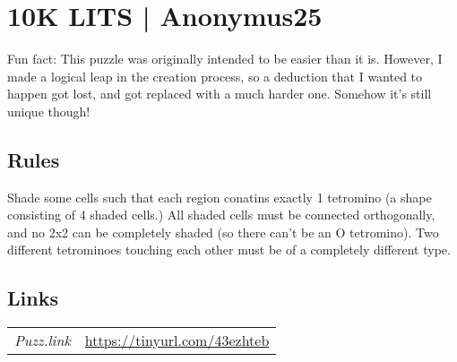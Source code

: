 \section[10K LITS | Anonymus25 {[\emph{LITS}]}]{10K LITS | {\normalfont Anonymus25}}
\label{sec:19-10k-lits-anonymus25}
Fun fact: This puzzle was originally intended to be easier than it is. However, I made a logical leap in the creation process, so a deduction that I wanted to happen got lost, and got replaced with a much harder one. Somehow it's still unique though!
\subsection*{Rules}
\begin{markdown}
Shade some cells such that each region conatins exactly 1 tetromino (a shape consisting of 4 shaded cells.) All shaded cells must be connected orthogonally, and no 2x2 can be completely shaded (so there can't be an O tetromino). Two different tetrominoes touching each other must be of a  completely different type.
\end{markdown}
\subsection*{Links}
\begin{tabularx}{\textwidth}{l X}
\emph{Puzz.link} & \url{https://tinyurl.com/43ezhteb} \\
\end{tabularx}
\pagebreak
